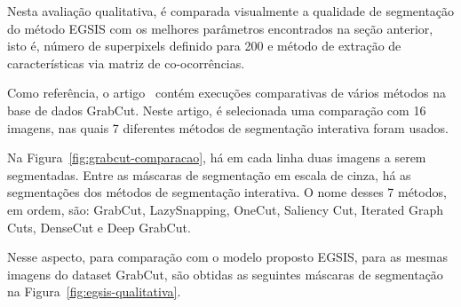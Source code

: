 Nesta avaliação qualitativa, é comparada visualmente a qualidade
de segmentação do método \gls{EGSIS} com os melhores parâmetros
encontrados na seção anterior, isto é, número de superpixels definido
para 200 e método de extração de características via matriz de
co-ocorrências.

Como referência, o artigo~\cite{wang2023review} contém execuções
comparativas de vários métodos na base de dados GrabCut. Neste artigo,
é selecionada uma comparação com 16 imagens, nas quais 7 diferentes
métodos de segmentação interativa foram usados.

\begin{figure}[h!]
        \captionsetup{width=16cm}
		\centering
\end{figure}
\FloatBarrier{}

Na Figura~\ref{fig:grabcut-comparacao}, há em cada linha duas
imagens a serem segmentadas. Entre as máscaras de segmentação em escala
de cinza, há as segmentações dos métodos de segmentação
interativa. O nome desses 7 métodos, em ordem, são: GrabCut,
LazySnapping, OneCut, Saliency Cut, Iterated Graph Cuts, DenseCut e
Deep GrabCut.

Nesse aspecto, para comparação com o modelo proposto \gls{EGSIS}, para
as mesmas imagens do dataset GrabCut, são obtidas as seguintes máscaras
de segmentação na Figura~\ref{fig:egsis-qualitativa}.

